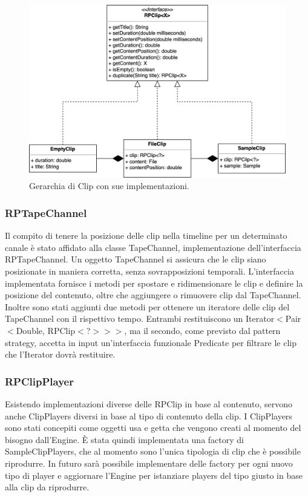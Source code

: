 \documentclass[a4paper,12pt]{report}
\begin{document}
\begin{figure}[H]
\centering{}
\includegraphics[width=\textwidth]{img/clip.png}
\caption{Gerarchia di Clip con sue implementazioni.}
\end{figure}

\subsubsection{RPTapeChannel}
Il compito di tenere la posizione delle clip nella timeline per un determinato canale è stato affidato alla classe TapeChannel, implementazione dell’interfaccia RPTapeChannel. Un oggetto TapeChannel si assicura che le clip siano posizionate in maniera corretta, senza sovrapposizioni temporali.
L’interfaccia implementata fornisce i metodi per spostare e ridimensionare le clip e definire la posizione del contenuto, oltre che aggiungere o rimuovere clip dal TapeChannel.
Inoltre sono stati aggiunti due metodi per ottenere un iteratore delle clip del TapeChannel con il rispettivo tempo. Entrambi restituiscono un Iterator\begin{math}<\end{math}Pair\begin{math}<\end{math}Double, RPClip\begin{math}<\end{math}?\begin{math}>>>\end{math}, ma il secondo, come previsto dal pattern strategy, accetta in input un'interfaccia funzionale Predicate per filtrare le clip che l’Iterator dovrà restituire.

\subsubsection{RPClipPlayer}
Esistendo implementazioni diverse delle RPClip in base al contenuto, servono anche ClipPlayers diversi in base al tipo di contenuto della clip.
I ClipPlayers sono stati concepiti come oggetti usa e getta che vengono creati al momento del bisogno dall’Engine. È stata quindi implementata una factory di SampleClipPlayers, che al momento sono l’unica tipologia di clip che è possibile riprodurre. In futuro sarà possibile implementare delle factory per ogni nuovo tipo di player e aggiornare l’Engine per istanziare players del tipo giusto in base alla clip da riprodurre.
\end{document}
